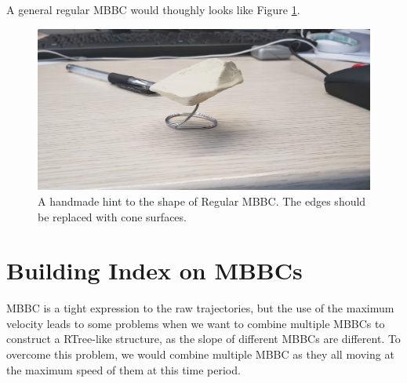 \documentclass[sigplan]{acmart}
\begin{document}
A general regular MBBC would thoughly looks like Figure \ref{fig:generalmbbc}.
\begin{figure}[ht]
  \centering
  \includegraphics[width=\linewidth]{generalmbbc.jpg}
  \caption{A handmade hint to the shape of Regular MBBC. The edges should be replaced with cone surfaces.}
  \label{fig:generalmbbc}
\end{figure}


\section{Building Index on MBBCs}
MBBC is a tight expression to the raw trajectories, but the use of the maximum velocity leads to some problems when we want to combine multiple MBBCs to construct a RTree-like structure, as the slope of different MBBCs are different. To overcome this problem, we would combine multiple MBBC as they all moving at the maximum speed of them at this time period.\par
\end{document}
